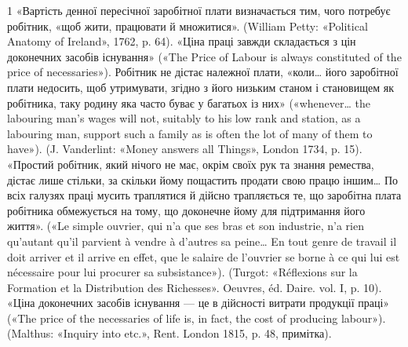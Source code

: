 1 «Вартість денної пересічної заробітної плати визначається тим,
чого потребує робітник, «щоб жити, працювати й множитися». (William
Petty: «Political Anatomy of Ireland», 1762, p. 64). «Ціна праці
завжди складається з цін доконечних засобів існування» («The Price of
Labour is always constituted of the price of necessaries»). Робітник не дістає
належної плати, «коли\dots{} його заробітної плати недосить, щоб утримувати,
згідно з його низьким станом і становищем як робітника, таку родину
яка часто буває у багатьох із них» («whenever\dots{} the labouring man’s
wages will not, suitably to his low rank and station, as a labouring man,
support such a family as is often the lot of many of them to have»). (J. Vanderlint:
«Money answers all Things», London 1734, p. 15). «Простий
робітник, який нічого не має, окрім своїх рук та знання ремества, дістає
лише стільки, за скільки йому пощастить продати свою працю іншим\dots{}
По всіх галузях праці мусить траплятися й дійсно трапляється те, що
заробітна плата робітника обмежується на тому, що доконечне йому
для підтримання його життя». («Le simple ouvrier, qui n’a que ses bras
et son industrie, n’a rien qu’autant qu’il parvient à vendre à d’autres sa
peine\dots{} En tout genre de travail il doit arriver et il arrive en effet, que le
salaire de l’ouvrier se borne à ce qui lui est nécessaire pour lui procurer
sa subsistance»). (Turgot: «Réflexions sur la Formation et la Distribution
des Richesses». Oeuvres, éd. Daire. vol. I, p. 10). «Ціна доконечних
засобів існування — це в дійсності витрати продукції праці» («The
price of the necessaries of life is, in fact, the cost of producing labour»).
(Malthus: «Inquiry into etc.», Rent. London 1815, p. 48, примітка).
\parbreak{}  %
